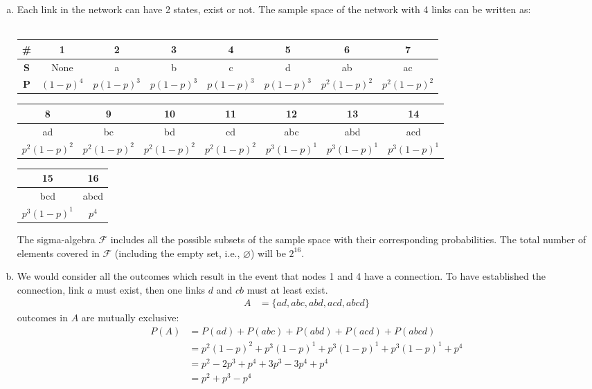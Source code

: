 \documentclass[12pt, letterpaper]{scrartcl}
\begin{document}
\begin{enumerate}[a.]
    \item Each link in the network can have 2 states, exist or not. The sample space of the network with 4 links can be written as:\\\\
    \begin{tabular}{ c|c|c|c|c|c|c|c } 
     \textbf{\#} & 1 & 2 &3&4&5&6&7\\ \hline
     \textbf{S} & None & a&b&c&d&ab&ac \\ \hline
     \textbf{P} & $(1-p)^4$ &$p(1-p)^3$&$p(1-p)^3$&$p(1-p)^3$&$p(1-p)^3$&$p^2(1-p)^2$&$p^2(1-p)^2$\\
    \end{tabular}

    \begin{tabular}{ c|c|c|c|c|c|c } 
     8&9&10&11&12&13&14\\ \hline
     ad&bc&bd&cd&abc&abd&acd \\ \hline
     $p^2(1-p)^2$&$p^2(1-p)^2$&$p^2(1-p)^2$&$p^2(1-p)^2$&$p^3(1-p)^1$&$p^3(1-p)^1$&$p^3(1-p)^1$
    \end{tabular}
    
    \begin{tabular}{ c|c } 
     15&16\\ \hline
     bcd&abcd \\ \hline
     $p^3(1-p)^1$&$p^4$
    \end{tabular}
    
    The sigma-algebra $\mathcal{F}$ includes all the possible subsets of the sample space with their corresponding probabilities. The total number of elements covered in $\mathcal{F}$ (including the empty set, i.e., $\varnothing$) will be $2^{16}$.

    
    \item We would consider all the outcomes which result in the event that nodes 1 and 4 have a connection. To have established the connection, link $a$ must exist, then one links $d$ and $cb$ must at least exist.
    \begin{align*}
        A &= \{ad, abc, abd, acd, abcd\}
    \end{align*}
    outcomes in $A$ are mutually exclusive:
    \begin{align*}
        P(A) &= P(ad)+P(abc)+P(abd)+P(acd)+P(abcd)\\
        &= p^2(1-p)^2+p^3(1-p)^1+p^3(1-p)^1+p^3(1-p)^1+p^4\\
        &= p^2-2p^3+p^4+3p^3-3p^4+p^4\\
        &=p^2+p^3-p^4
    \end{align*}
    

\end{enumerate}
\end{document}
